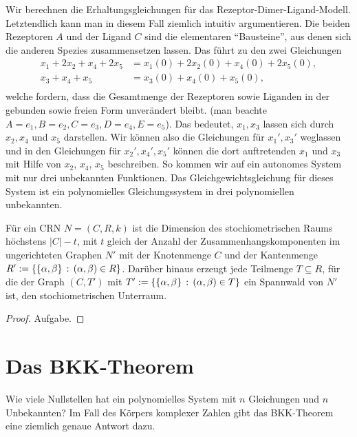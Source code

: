 \documentclass[11pt]{article}
\numberwithin{equation}{section}
\begin{document}
\begin{beispiel}
	Wir berechnen die Erhaltungsgleichungen für das Rezeptor-Dimer-Ligand-Modell. Letztendlich kann man in diesem Fall ziemlich intuitiv argumentieren. Die beiden Rezeptoren $A$ und der Ligand $C$ sind die elementaren ``Bausteine'', aus denen sich die anderen Spezies zusammensetzen lassen. Das führt zu den zwei Gleichungen 
	\begin{align*}
			x_1 + 2 x_2 + x_4 + 2 x_5 & = x_1(0) + 2 x_2(0) +   x_4(0) + 2 x_5(0),
			\\ x_3 + x_4 + x_5 & = x_3(0) +x_4(0) + x_5(0), \\ 
	\end{align*}
	welche fordern, dass die Gesamtmenge der Rezeptoren sowie Liganden in der gebunden sowie freien Form unverändert bleibt. 
	(man beachte $A= e_1, B= e_2, C= e_3, D = e_4, E = e_5$). 
	Das bedeutet, $x_1, x_3$ lassen sich durch $x_2, x_4$ und $x_5$ darstellen. Wir können also die Gleichungen für $x_1', x_3'$ weglassen und in den Gleichungen für $x_2',x_4',x_5'$ können die dort auftretenden  $x_1$ und $x_3$ mit Hilfe von $x_2$, $x_4$, $x_5$ beschreiben. So kommen wir auf ein autonomes System mit nur drei unbekannten Funktionen. Das Gleichgewichtsgleichung für dieses System ist ein polynomielles Gleichungssystem in drei polynomiellen unbekannten. 
\end{beispiel} 

\begin{proposition}
	Für ein CRN $N=(C,R,k)$ ist die Dimension des stochiometrischen Raums höchstens $|C| - t$, mit $t$ gleich der Anzahl der Zusammenhangskomponenten im  ungerichteten Graphen $N'$ mit der Knotenmenge $C$ und der Kantenmenge $R':=\left\{  \{\alpha, \beta\}  \,:\, (\alpha,\beta) \in R \right\}$. Darüber hinaus erzeugt jede  Teilmenge $T \subseteq R$, für die der Graph $(C,T')$ mit $T':= \left\{  \{\alpha,\beta\}  \,:\, (\alpha,\beta) \in T \right\}$ ein Spannwald von $N'$ ist, den stochiometrischen Unterraum. 
\end{proposition} 
\begin{proof}
	Aufgabe. 
\end{proof} 


\section{Das BKK-Theorem}  

Wie viele Nullstellen hat ein polynomielles System mit $n$ Gleichungen und $n$ Unbekannten? Im Fall des Körpers komplexer Zahlen gibt das BKK-Theorem eine ziemlich genaue Antwort dazu. 
\end{document}
